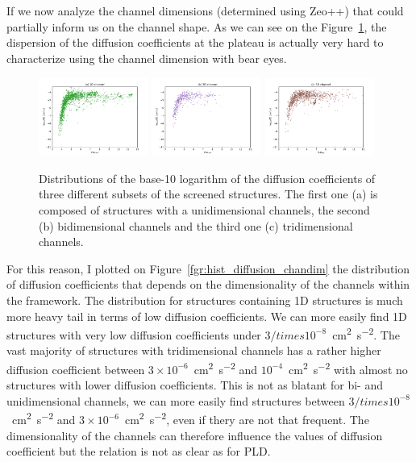 \documentclass[main]{subfiles}
\begin{document}
If we now analyze the channel dimensions (determined using Zeo++) that could partially inform us on the channel shape. As we can see on the Figure~\ref{fgr:scatter_diffusion_chandim}, the dispersion of the diffusion coefficients at the plateau is actually very hard to characterize using the channel dimension with bear eyes. 

\begin{figure}[ht]
  \centering
    \includegraphics[width=0.32\textwidth]{figures/5-diffusion/D_log-PLD_1D_chan.pdf}
    \includegraphics[width=0.32\textwidth]{figures/5-diffusion/D_log-PLD_2D_chan.pdf}
    \includegraphics[width=0.32\textwidth]{figures/5-diffusion/D_log-PLD_3D_chan.pdf}
    \caption{ Distributions of the base-10 logarithm of the diffusion coefficients of three different subsets of the screened structures. The first one (a) is composed of structures with a unidimensional channels, the second (b) bidimensional channels and the third one (c) tridimensional channels. }\label{fgr:scatter_diffusion_chandim}
\end{figure}

For this reason, I plotted on Figure~\ref{fgr:hist_diffusion_chandim} the distribution of diffusion coefficients that depends on the dimensionality of the channels within the framework. The distribution for structures containing 1D structures is much more heavy tail in terms of low diffusion coefficients. We can more easily find 1D structures with very low diffusion coefficients under $3/times 10^{-8}$~\si{\square\cm\per\square\s}. The vast majority of structures with tridimensional channels has a rather higher diffusion coefficient between $3\times 10^{-6}$~\si{\square\cm\per\square\s} and $10^{-4}$~\si{\square\cm\per\square\s} with almost no structures with lower diffusion coefficients. This is not as blatant for bi- and unidimensional channels, we can more easily find structures between $3/times 10^{-8}$~\si{\square\cm\per\square\s} and $3\times 10^{-6}$~\si{\square\cm\per\square\s}, even if thery are not that frequent. The dimensionality of the channels can therefore influence the values of diffusion coefficient but the relation is not as clear as for PLD.
\end{document}

